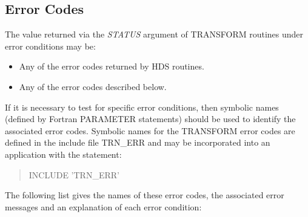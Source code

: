 \documentclass[twoside,nolof,11pt]{starlink}
\providecommand{\name}[1]{\small{#1}}
\providecommand{\fortvar}[1]{\emph{#1}}
\begin{document}
\subsection{Error Codes}

The value returned via the \fortvar{STATUS} argument of \name{TRANSFORM}
routines under error conditions may be:

\begin{itemize}

\item Any of the error codes returned by \name{HDS} routines.

\item Any of the error codes described below.

\end{itemize}

If it is necessary to test for specific error conditions, then symbolic
names (defined by Fortran \name{PARAMETER} statements) should be used to
identify the associated error codes.
Symbolic names for the \name{TRANSFORM} error codes are defined in the
include file \name{TRN\_ERR} and may be incorporated into an application
with the statement:

\begin{quote}
\begin{terminalv}
INCLUDE 'TRN_ERR'
\end{terminalv}
\end{quote}

The following list gives the names of these error codes, the associated
error messages and an explanation of each error condition:
\end{document}
